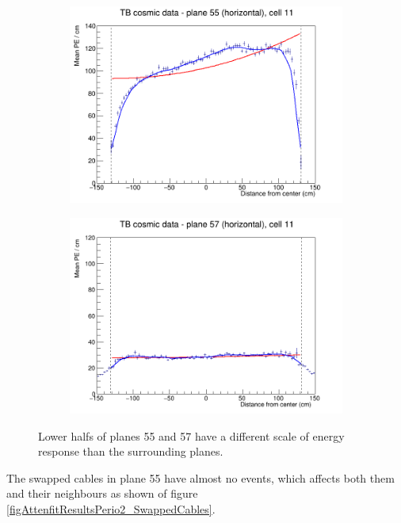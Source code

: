 \documentclass[12pt,a4paper]{article}
\begin{document}
\begin{figure}[h]
  \begin{subfigure}{0.5\textwidth}
    \includegraphics[width=\linewidth]{RelativeCalibrationResults/p2_055_011_extendedRange.png}
  \end{subfigure}
  \begin{subfigure}{0.5\textwidth}
    \includegraphics[width=\linewidth]{RelativeCalibrationResults/p2_057_011.png}
  \end{subfigure}
  \caption{Lower halfs of planes 55 and 57 have a different scale of energy response than the surrounding planes.}
  \label{figAttenfitResultsPerio2_FaultyFEB}
\end{figure}

The swapped cables in plane 55 have almost no events, which affects both them and their neighbours as shown of figure \ref{figAttenfitResultsPerio2_SwappedCables}.
\end{document}
